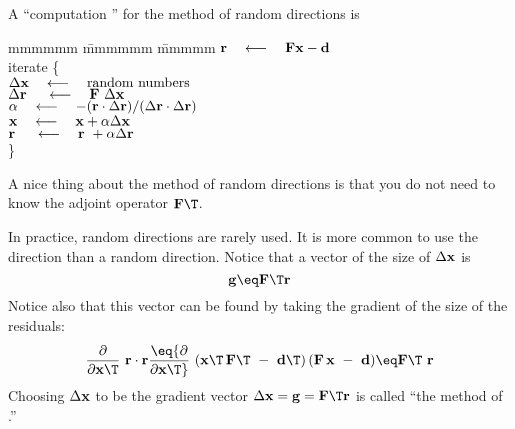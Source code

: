 \par
A ``computation '' for the method of random directions is
\def\padarrow{\quad\longleftarrow\quad}
\label{lsq/'randtemplate'}
\begin{tabbing}
mmmmmm \= mmmmmm \= mmmmm \kill
\> $\bold r \padarrow \bold F \bold x - \bold d$ \\
\> {\rm iterate \{ }                                                    \\
\>      \>  $\Delta \bold x   \padarrow {\rm random\ numbers}$          \\
\>      \>  $\Delta \bold r\  \padarrow \bold F \  \Delta \bold x$      \\
\>      \> $\alpha \padarrow
                -(       \bold r \cdot \Delta\bold r )/
                 (\Delta \bold r \cdot \Delta\bold r )
                $
                \\
\>      \> $\bold x   \padarrow \bold x   + \alpha\Delta \bold x$       \\
\>      \> $\bold r\  \padarrow \bold r\  + \alpha\Delta \bold r$       \\
\>      \> \}                                                   
\end{tabbing}
A nice thing about the method of random directions is that you
do not need to know the adjoint operator $\bold F\T$.

\par
In practice, random directions are rarely used.
It is more common to use the  direction than a random direction.
Notice that a vector of the size of $\Delta \bold x$ is
\begin{equation}
\bold g \eq  \bold F\T \bold r
\end{equation}
Notice also that this vector can be found by taking the gradient
of the size of the residuals:
\begin{equation}
{\partial \over  \partial \bold x\T }  \ \bold r \cdot \bold r
\eq
{\partial \over  \partial \bold x\T }  \ 
( \bold x\T \, \bold F\T  \ -\  \bold d\T) \,
( \bold F  \, \bold x   \ -\  \bold d)
\eq
\bold F\T \  \bold r
\end{equation}
Choosing $\Delta \bold x$ to be the gradient vector
$\Delta\bold x = \bold g = \bold F\T \bold r$
is called ``the method of .''

